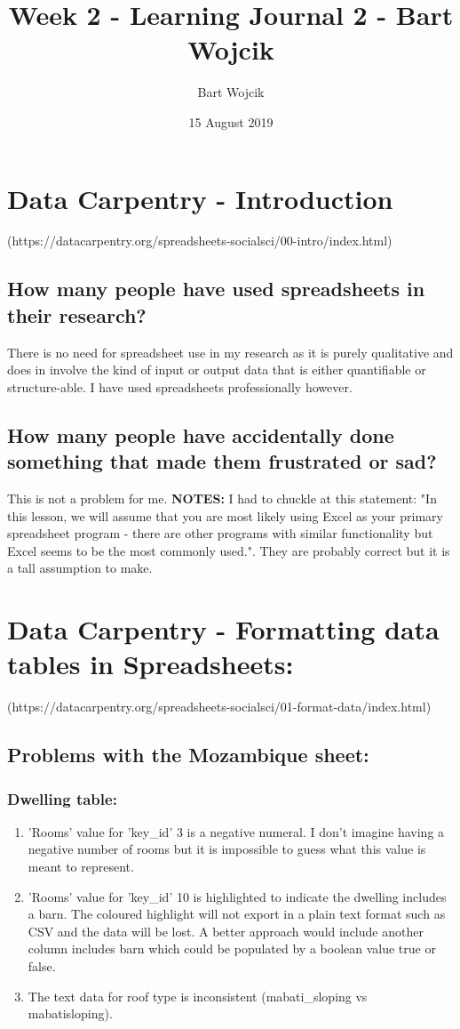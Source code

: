 \documentclass{article}
\title{Week 2 - Learning Journal 2 - Bart Wojcik}
\author{Bart Wojcik}
\date{15 August 2019}
\begin{document}
\maketitle

\section{Data Carpentry - Introduction}
(https://datacarpentry.org/spreadsheets-socialsci/00-intro/index.html)
\subsection{How many people have used spreadsheets in their research?}
There is no need for spreadsheet use in my research as it is purely qualitative and does in involve the kind of input or output data that is either quantifiable or structure-able. I have used spreadsheets professionally however.
\subsection{How many people have accidentally done something that made them frustrated or sad?}
This is not a problem for me.\newline
\newline
\textbf{NOTES:} I had to chuckle at this statement: "In this lesson, we will assume that you are most likely using Excel as your primary spreadsheet program - there are other programs with similar functionality but Excel seems to be the most commonly used.". They are probably correct but it is a tall assumption to make.

\section{Data Carpentry - Formatting data tables in Spreadsheets:}
(https://datacarpentry.org/spreadsheets-socialsci/01-format-data/index.html)

\subsection{Problems with the Mozambique sheet:}
\subsubsection{Dwelling table:}
\begin{enumerate}
    \item 'Rooms' value for 'key\_id' 3 is a negative numeral. I don't imagine having a negative number of rooms but it is impossible to guess what this value is meant to represent.
    \item 'Rooms' value for 'key\_id' 10 is highlighted to indicate the dwelling includes a barn. The coloured highlight will not export in a plain text format such as CSV and the data will be lost. A better approach would include another column includes barn which could be populated by a boolean value true or false.
    \item The text data for roof type is inconsistent (mabati\_sloping vs mabatisloping).
\end{enumerate}
\end{document}
